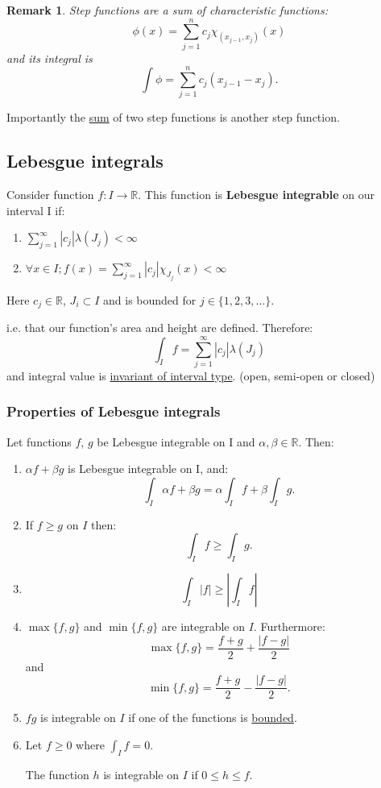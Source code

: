 \documentclass{article}
\newtheorem*{remark}{Remark}
\begin{document}
\begin{remark}
    Step functions are a sum of characteristic functions:
    $$\phi(x)
    =\sum_{j=1}^{n} c_j \chi_{(x_{j-1}, x_j)}(x)$$
    and its integral is
    $$\int\phi=\sum_{j=1}^{n} c_j (x_{j-1}-x_j).$$
\end{remark}

Importantly the \underline{sum} of two step functions is another step function.
    
\newpage

\subsection{Lebesgue integrals}
Consider function $f:I \rightarrow \mathbb{R}$. This function is \textbf{Lebesgue integrable} on our interval I if:
\begin{enumerate}
    \item $\displaystyle\sum_{j=1}^{\infty} |c_j| \lambda(J_j) < \infty$

    \item $\forall x\in I; f(x)=\displaystyle\sum_{j=1}^{\infty} |c_j| \chi_{J_j}(x)<\infty$
\end{enumerate}
Here $c_j \in \mathbb{R}$, $J_i \subset I$ and is bounded for $j \in \{1, 2, 3, \dots\}$.

i.e. that our function's area and height are defined. Therefore:
$$\int_I f = \sum_{j=1}^{\infty} |c_j| \lambda(J_j)$$
and integral value is \underline{invariant of interval type}. (open, semi-open or closed)

\subsubsection{Properties of Lebesgue integrals}
Let functions $f$, $g$ be Lebesgue integrable on I and $\alpha, \beta\in\mathbb{R}$. Then:
\begin{enumerate}
    \item $\alpha f+\beta g$ is Lebesgue integrable on I, and:
    $$\int_I\alpha f+\beta g=\alpha\int_I f + \beta\int_I g.$$

    \item If $f\geq g$ on $I$ then:
    $$\int_I f\geq\int_I g.$$

    \item $$\int_I|f|\geq|\int_I f|$$

    \item $\max\{f,g\}$ and $\min\{f,g\}$ are integrable on $I$. Furthermore:
    $$\max\{f,g\}=\frac{f+g}{2}+\frac{|f-g|}{2}$$
    and
    $$\min\{f,g\}=\frac{f+g}{2}-\frac{|f-g|}{2}.$$

    \item $fg$ is integrable on $I$ if one of the functions is \underline{bounded}.

    \item Let $f\geq0$ where $\displaystyle\int_I f=0$.
    
    The function $h$ is integrable on $I$ if $0\leq h\leq f$.
\end{enumerate}
\end{document}

